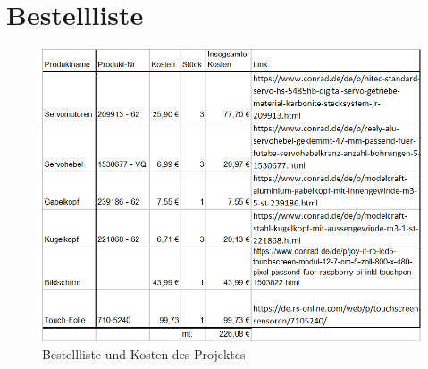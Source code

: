 \documentclass[12pt,a4paper,bibliography=totoc,listof=totoc]{scrartcl}
\begin{document}
\section {Bestellliste}

\begin{figure}[htbp]
	\centering
	\includegraphics[scale = 0.8]{pics/Bestelliste}
	\caption{Bestellliste und Kosten des Projektes}
	\label{fig:bestell}
\end{figure}
\end{document}
